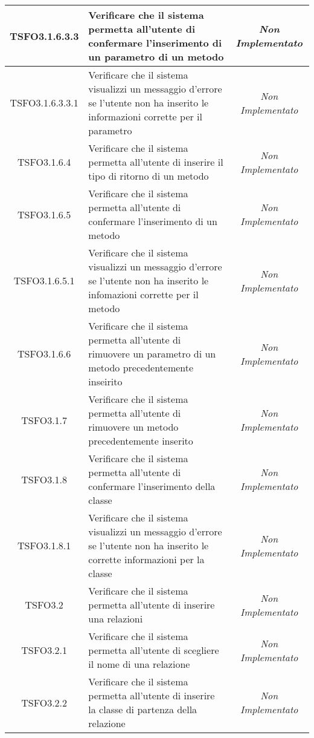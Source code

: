 \begin{longtable}{|c|>{}m{8cm}|c|}
\hypertarget{TSFO3.1.6.3.3}{TSFO3.1.6.3.3} & Verificare che il sistema permetta all'utente di confermare l'inserimento di un parametro di un metodo & \textit{Non Implementato}\\ \hline
\hypertarget{TSFO3.1.6.3.3.1}{TSFO3.1.6.3.3.1} & Verificare che il sistema visualizzi un messaggio d'errore se l'utente non ha inserito le informazioni corrette per il parametro & \textit{Non Implementato}\\ \hline
\hypertarget{TSFO3.1.6.4}{TSFO3.1.6.4} & Verificare che il sistema permetta all'utente di inserire il tipo di ritorno di un metodo & \textit{Non Implementato}\\ \hline
\hypertarget{TSFO3.1.6.5}{TSFO3.1.6.5} & Verificare che il sistema permetta all'utente di confermare l'inserimento di un metodo & \textit{Non Implementato}\\ \hline
\hypertarget{TSFO3.1.6.5.1}{TSFO3.1.6.5.1} & Verificare che il sistema visualizzi un messaggio d'errore se l'utente non ha inserito le infomazioni corrette per il metodo & \textit{Non Implementato}\\ \hline
\hypertarget{TSFO3.1.6.6}{TSFO3.1.6.6} & Verificare che il sistema permetta all'utente di rimuovere un parametro di un metodo precedentemente inseirito & \textit{Non Implementato}\\ \hline
\hypertarget{TSFO3.1.7}{TSFO3.1.7} & Verificare che il sistema permetta all'utente di rimuovere un metodo precedentemente inserito & \textit{Non Implementato}\\ \hline
\hypertarget{TSFO3.1.8}{TSFO3.1.8} & Verificare che il sistema permetta all'utente di confermare l'inserimento della classe & \textit{Non Implementato}\\ \hline
\hypertarget{TSFO3.1.8.1}{TSFO3.1.8.1} & Verificare che il sistema visualizzi un messaggio d'errore se l'utente non ha inserito le corrette informazioni per la classe & \textit{Non Implementato}\\ \hline
\hypertarget{TSFO3.2}{TSFO3.2} & Verificare che il sistema permetta all'utente di inserire una relazioni & \textit{Non Implementato}\\ \hline
\hypertarget{TSFO3.2.1}{TSFO3.2.1} & Verificare che il sistema permetta all'utente di scegliere il nome di una relazione & \textit{Non Implementato}\\ \hline
\hypertarget{TSFO3.2.2}{TSFO3.2.2} & Verificare che il sistema permetta all'utente di inserire la classe di partenza della relazione & \textit{Non Implementato}\\ \hline

\end{longtable}
